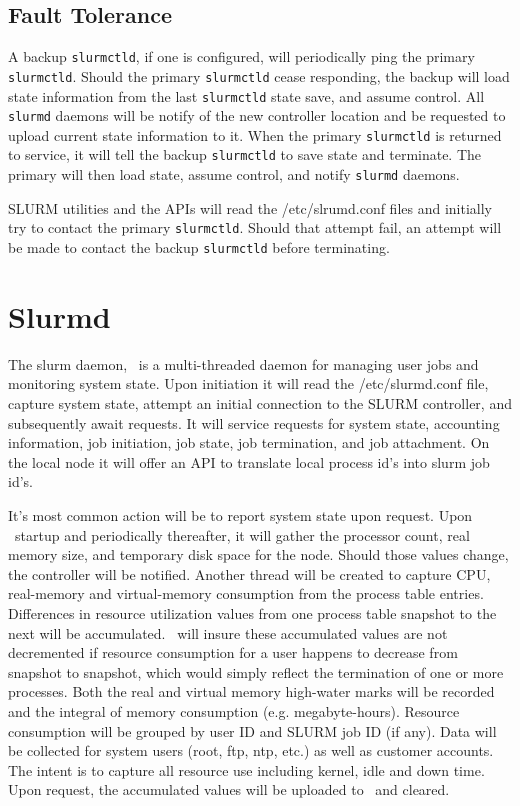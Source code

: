 \subsection{Fault Tolerance}

A backup {\tt slurmctld}, if one is configured, will periodically ping
the primary {\tt slurmctld}.  Should the primary {\tt slurmctld} cease
responding, the backup will load state information from the last 
{\tt slurmctld} state save, and assume control.  All {\tt slurmd} daemons
will be notify of the new controller location and be requested to upload
current state information to it.  When the primary {\tt slurmctld} is
returned to service, it will tell the backup {\tt slurmctld} to save
state and terminate.  The primary will then load state, assume control,
and notify {\tt slurmd} daemons.

SLURM utilities and the APIs will read the /etc/slrumd.conf files 
and initially try to contact the primary {\tt slurmctld}. 
Should that attempt fail, an attempt will be made to contact the 
backup {\tt slurmctld} before terminating.

\section{Slurmd}

The slurm daemon, \slurmd\, is a multi-threaded daemon for managing
user jobs and monitoring system state.  Upon initiation it will read
the /etc/slurmd.conf file, capture system state, attempt an initial
connection to the SLURM controller, and subsequently await requests.
It will service requests for system state, accounting information,
job initiation, job state, job termination, and job attachment. On the
local node it will offer an API to translate local process id's into
slurm job id's. 

It's most common action will be to report system state upon request. Upon
\slurmd\ startup and periodically thereafter, it will gather the processor
count, real memory size, and temporary disk space for the node. Should
those values change, the controller will be notified.  Another thread will
be created to capture CPU, real-memory and virtual-memory consumption from
the process table entries.  Differences in resource utilization values
from one process table snapshot to the next will be accumulated. \slurmd\ 
will insure these accumulated values are not decremented if resource
consumption for a user happens to decrease from snapshot to snapshot,
which would simply reflect the termination of one or more processes.
Both the real and virtual memory high-water marks will be recorded and
the integral of memory consumption (e.g. megabyte-hours).  Resource
consumption will be grouped by user ID and SLURM job ID (if any). Data
will be collected for system users (root, ftp, ntp, etc.) as well as
customer accounts. The intent is to capture all resource use including
kernel, idle and down time.  Upon request, the accumulated values will be
uploaded to \slurmctld\ and cleared.  

